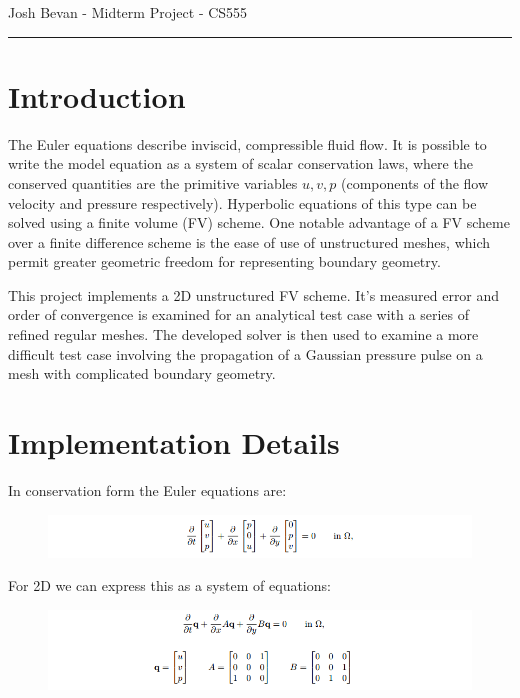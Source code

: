 \documentclass[letterpaper,10pt]{article}
\begin{document}
\begin{flushright}
{\Large Josh Bevan - Midterm Project - CS555}
\end{flushright}
\vskip -0.1in
\hrule
\vskip 0.3in

\section*{Introduction}
The Euler equations describe inviscid, compressible fluid flow. It is possible to write the model equation as a system of scalar conservation laws, where the conserved quantities are the primitive variables $u,v,p$ (components of the flow velocity and pressure respectively). Hyperbolic equations of this type can be solved using a finite volume (FV) scheme. One notable advantage of a FV scheme over a finite difference scheme is the ease of use of unstructured meshes, which permit greater geometric freedom for representing boundary geometry.

This project implements a 2D unstructured FV scheme. It's measured error and order of convergence is examined for an analytical test case with a series of refined regular meshes. The developed solver is then used to examine a more difficult test case involving the propagation of a Gaussian pressure pulse on a mesh with complicated boundary geometry.

\section*{Implementation Details}
In conservation form the Euler equations are:
\begin{figure}[!htb]
\includegraphics[width=1\textwidth]{1.PNG}
\end{figure}

For 2D we can express this as a system of equations:

\begin{figure}[!htb]
\includegraphics[width=1\textwidth]{2.PNG}
\end{figure}
\end{document}
